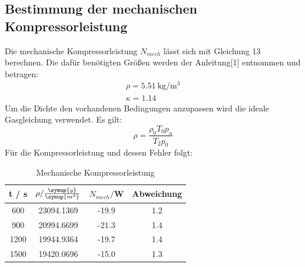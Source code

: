 \subsection{Bestimmung der mechanischen Kompressorleistung}
Die mechanische Kompressorleistung $N_{mech}$ lässt sich mit Gleichung 13 berechnen. Die dafür
benötigten Größen werden der Anleitung[1] entnommen und betragen:
\begin{align}
  \rho = \SI{5.51}{\kilo\gram\per\cubic\meter} \\
  \kappa = 1.14
\end{align}
Um die Dichte den vorhandenen Bedingungen anzupassen wird die ideale Gasgleichung
verwendet. Es gilt:
\begin{equation}
  \rho = \frac{\rho_0 T_0 p_a}{T_2 p_0}
\end{equation}
Für die Kompressorleistung und dessen Fehler folgt:
\begin{table}
  \centering
  \caption{Mechanische Kompressorleistung}
  \label{tab:Mechanische Kompressorleistung}
  \begin{tabular}{c c c c}
    \toprule
    t / s  &$\rho/\frac{\symup{g}}{\symup{m^3}}$ & $N_{mech}/$W & Abweichung \\
    \midrule
     600 & 23094.1369 & -19.9 & 1.2 \\
     900 & 20994.6699 & -21.3 & 1.4 \\
    1200 & 19944.9364 & -19.7 & 1.4 \\
    1500 & 19420.0696 & -15.0 & 1.3 \\
    \bottomrule
  \end{tabular}
\end{table}
